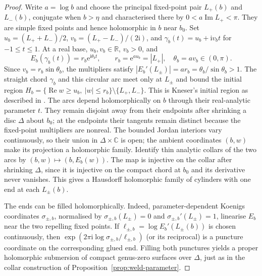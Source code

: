 \documentclass[11pt,a4paper]{article}
\theoremstyle{definition}
\newcommand{\eee}{\mathrm{e}}
\newcommand{\ii}{\mathrm{i}}
\begin{document}
\begin{proof}
Write $a=\log b$ and choose the principal fixed-point pair $L_+(b)$ and
$L_-(b)$, conjugate when $b>\eta$ and characterised there by
$0<a\operatorname{Im}L_+<\pi$.  They are simple fixed
points and hence holomorphic in $b$ near $b_0$.  Set
$u_b=(L_++L_-)/2$, $v_b=(L_+-L_-)/(2\ii)$, and
$\gamma_b(t)=u_b+\ii v_b t$ for $-1\le t\le1$.
At a real base, $u_b,v_b\in\mathbb R$, $v_b>0$, and
\[
 E_b(\gamma_b(t))=r_b\eee^{\ii\theta_b t},\qquad
 r_b=\eee^{a u_b}=|L_+|,\quad
 \theta_b=a v_b\in(0,\pi).
\]
Since $v_b=r_b\sin\theta_b$, the multipliers satisfy
$|E_b'(L_\pm)|=a r_b=\theta_b/\sin\theta_b>1$.
The straight chord $\gamma_b$ and this circular arc meet only at
$L_\pm$ and bound the initial region
$H_b=\{\operatorname{Re}w\ge u_b,\ |w|\le r_b\}\setminus\{L_+,L_-\}$.
This is Kneser's initial region as described in
\cite[\S4, Lem.~4]{TrappmannKouznetsov2011}.
The arcs depend holomorphically on $b$ through their real-analytic
parameter $t$.  They remain disjoint away from their endpoints after
shrinking a disc $\Delta$ about $b_0$; at the endpoints their tangents
remain distinct because the fixed-point multipliers are nonreal.
The bounded Jordan interiors vary continuously, so their union in
$\Delta\times\mathbb C$ is open; the ambient coordinates $(b,w)$ make
its projection a holomorphic family.  Identify thin analytic collars
of the two arcs by
$(b,w)\mapsto(b,E_b(w))$.  The map is injective on the collar after
shrinking $\Delta$, since it is injective on the compact chord at
$b_0$ and its derivative never vanishes.  This gives a Hausdorff
holomorphic family of cylinders with one end at each $L_\pm(b)$.

The ends can be filled holomorphically.  Indeed, parameter-dependent
Koenigs coordinates $\sigma_{\pm,b}$, normalised by
$\sigma_{\pm,b}(L_\pm)=0$ and $\sigma_{\pm,b}'(L_\pm)=1$,
linearise $E_b$ near the two repelling fixed points.  If
$\ell_{\pm,b}=\log E_b'(L_\pm(b))$ is
chosen continuously, then
$\exp(2\pi\ii\log\sigma_{\pm,b}/\ell_{\pm,b})$ (or its reciprocal)
is a puncture coordinate on the corresponding glued end.  Filling
both punctures yields a proper holomorphic submersion of compact
genus-zero surfaces over $\Delta$, just as in the collar construction
of Proposition~\ref{prop:weld-parameter}.


\end{proof}
\end{document}
